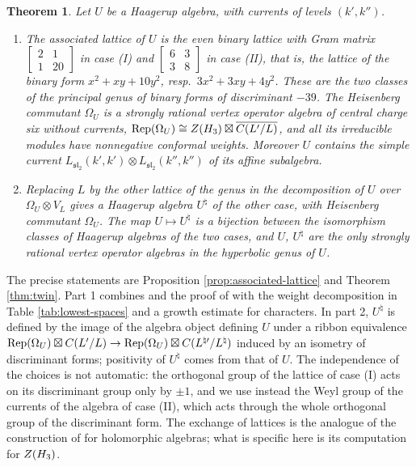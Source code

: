 \documentclass[leqno]{article}
\let\cal\relax
\newcommand{\cal}{\mathcal}
\newcommand{\ot}{\otimes}
\DeclareMathOperator{\Rep}{Rep}
\newtheorem{thm}{Theorem}[section]
\numberwithin{equation}{section}
\begin{document}
\begin{thm}
\label{thm:intro-genus}
Let $U$ be a Haagerup algebra, with currents of levels $(k',k'')$.
\begin{enumerate}
\item The associated lattice of $U$ is the even binary lattice with Gram matrix $\left[\begin{smallmatrix}2&1\\1&20\end{smallmatrix}\right]$ in case (I) and $\left[\begin{smallmatrix}6&3\\3&8\end{smallmatrix}\right]$ in case (II), that is, the lattice of the binary form $x^2+xy+10y^2$, resp.\ $3x^2+3xy+4y^2$. These are the two classes of the principal genus of binary forms of discriminant $-39$. The Heisenberg commutant $\Omega_U$ is a strongly rational vertex operator algebra of central charge six without currents, $\Rep(\Omega_U) \cong Z(\cal H_3) \boxtimes \overline{\cal C(L'/L)}$, and all its irreducible modules have nonnegative conformal weights. Moreover $U$ contains the simple current $L_{\mathfrak{sl}_2}(k',k') \ot L_{\mathfrak{sl}_2}(k'',k'')$ of its affine subalgebra.
\item Replacing $L$ by the other lattice of the genus in the decomposition of $U$ over $\Omega_U \ot V_L$ gives a Haagerup algebra $U^\natural$ of the other case, with Heisenberg commutant $\Omega_U$. The map $U \mapsto U^\natural$ is a bijection between the isomorphism classes of Haagerup algebras of the two cases, and $U$, $U^\natural$ are the only strongly rational vertex operator algebras in the hyperbolic genus of $U$.
\end{enumerate}
\end{thm}

The precise statements are Proposition \ref{prop:associated-lattice} and Theorem \ref{thm:twin}. Part 1 combines \cite[Proposition 2.14]{MoR24a} and the proof of \cite[Corollary 4.10]{MoR24a} with the weight decomposition in Table \ref{tab:lowest-spaces} and a growth estimate for characters. In part 2, $U^\natural$ is defined by the image of the algebra object defining $U$ under a ribbon equivalence $\Rep(\Omega_U) \boxtimes \cal C(L'/L) \to \Rep(\Omega_U) \boxtimes \cal C(L^{\natural\prime}/L^\natural)$ induced by an isometry of discriminant forms; positivity of $U^\natural$ comes from that of $U$. The independence of the choices is not automatic: the orthogonal group of the lattice of case (I) acts on its discriminant group only by $\pm1$, and we use instead the Weyl group of the currents of the algebra of case (II), which acts through the whole orthogonal group of the discriminant form. The exchange of lattices is the analogue of the construction of \cite[Proposition 5.3]{MoR24a} for holomorphic algebras; what is specific here is its computation for $Z(\cal H_3)$.
\end{document}
